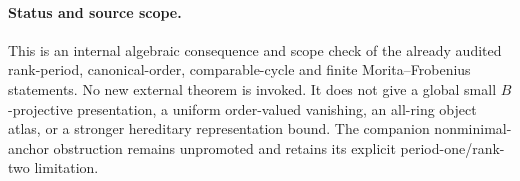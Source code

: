 \paragraph{Status and source scope.}
This is an internal algebraic consequence and scope check of the
already audited rank-period, canonical-order, comparable-cycle and
finite Morita--Frobenius statements.  No new external theorem is
invoked.  It does not give a global small $B$-projective presentation,
a uniform order-valued vanishing, an all-ring object atlas, or a
stronger hereditary representation bound.  The companion
nonminimal-anchor obstruction remains unpromoted and retains its
explicit period-one/rank-two limitation.

